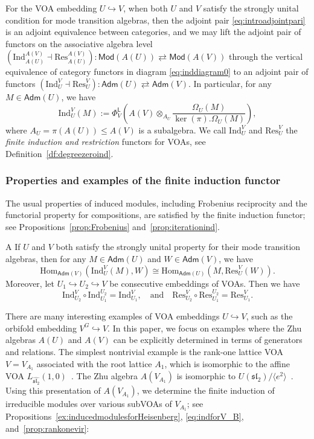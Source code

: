 \documentclass[12pt,a4paper,reqno]{amsart}
\numberwithin{equation}{section}
\numberwithin{equation}{section}
\theoremstyle{definition}
\def \Hom {\mathrm{Hom}}
\def\Ind{\mathrm{Ind}}
\def\Res{\mathrm{Res}}
\def\L{\mathcal{L}}
\def\o{\otimes}
\def\Om{\Omega}
\def\Ind{\mathrm{Ind}}
\def\L{\mathsf{L}}
\def\L{\mathsf{L}}
\def\adm{\mathsf{Adm}}
\begin{document}
	
	For the VOA embedding $U\hookrightarrow V$, when both $U$ and $V$ satisfy the strongly unital condition for mode transition algebras, then the adjoint pair \eqref{eq:introadjointpari} is an adjoint equivalence between categories, and we may lift the adjoint pair of functors on the associative algebra level $(\Ind^{A(V)}_{A(U)}\dashv \Res^{A(V)}_{A(U)}):  \mathsf{Mod}(A(U))\rightleftarrows  \mathsf{Mod}(A(V))$ through the vertical equivalence of category functors in diagram \eqref{eq:inddiagram0} to an adjoint pair of functors $(\Ind^V_U\dashv \Res^V_U): \adm(U)\rightleftarrows\adm(V)$. In particular, for any $M\in \adm(U)$, we have 
\begin{equation}\label{eq:introfiniteind}
\Ind^V_U(M):=\Phi_V^\L\left(A(V)\o_{A_U}\frac{\Om_U(M)}{\ker(\pi).\Om_U(M)}\right),
\end{equation}	
	where $A_U=\pi(A(U))\leq A(V)$ is a subalgebra. We call $\Ind^V_U$ and $ \Res^V_U$ the {\em finite induction and restriction} functors for VOAs, see Definition~\ref{df:degreezeroind}. 

\subsubsection{Properties and examples of the finite induction functor}
The usual properties of induced modules, including Frobenius reciprocity and the functorial property for compositions, are satisfied by the finite induction functor; see Propositions~\ref{prop:Frobenius} and~\ref{prop:iterationind}. 

\begin{customthm}{A}\label{main:A}
	If $U$ and $V$ both satisfy the strongly unital property for their mode transition algebras, then for any $M \in \adm(U)$ and $W \in \adm(V)$, we have
	\[
	\Hom_{\adm(V)}(\Ind^V_U(M), W) \cong \Hom_{\adm(U)}(M, \Res^V_U(W)).
	\]
	Moreover, let $U_1 \hookrightarrow U_2 \hookrightarrow V$ be consecutive embeddings of VOAs. Then we have 
	\[
	\Ind^V_{U_2} \circ \Ind^{U_2}_{U_1} = \Ind^V_{U_1}, 
	\quad \text{and} \quad 
	\Res^{V}_{U_2} \circ \Res^{U_2}_{U_1} = \Res^{V}_{U_1}.
	\]
\end{customthm}

There are many interesting examples of VOA embeddings $U \hookrightarrow V$, such as the orbifold embedding $V^G \hookrightarrow V$. In this paper, we focus on examples where the Zhu algebras $A(U)$ and $A(V)$ can be explicitly determined in terms of generators and relations. The simplest nontrivial example is the rank-one lattice VOA $V = V_{A_1}$ associated with the root lattice $A_1$, which is isomorphic to the affine VOA $L_{\widehat{\mathfrak{sl}_2}}(1,0)$~\cite{FK80}. The Zhu algebra $A(V_{A_1})$ is isomorphic to $U(\mathfrak{sl}_2)/\langle e^2 \rangle$~\cite{FZ92}. Using this presentation of $A(V_{A_1})$, we determine the finite induction of irreducible modules over various subVOAs of $V_{A_1}$; see Propositions~\ref{ex:inducedmodulesforHeisenberg}, \ref{eq:indforV_B}, and~\ref{prop:rankonevir}:
\end{document}
